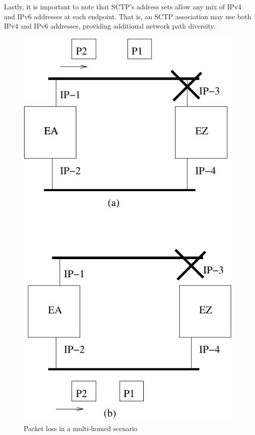 \documentclass[conference]{IEEEtran}
\begin{document}
Lastly, it is important to note that SCTP's address sets allow any mix of IPv4 and IPv6
addresses at each endpoint.  That is, an SCTP association may use both IPv4 and IPv6 addresses,
providing additional network path diversity.
\begin{figure}
\includegraphics{multihome}
\caption{Packet loss in a multi-homed scenario}
\label{mhomeloss}
\end{figure}
\end{document}
